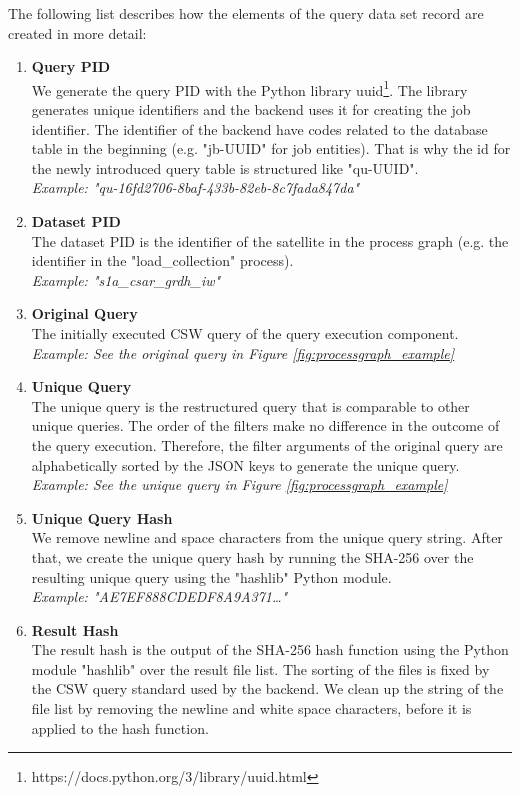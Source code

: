 \documentclass[draft,final]{vutinfth} %
\begin{document}
The following list describes how the elements of the query data set record are created in more detail:
\newpage
\begin{enumerate}
	\item \textbf{Query PID} \\
	We generate the query PID with the Python library uuid\footnote{https://docs.python.org/3/library/uuid.html}. The library generates unique identifiers and the backend uses it for creating the job identifier. The identifier of the backend have codes related to the database table in the beginning (e.g. "jb-UUID" for job entities). That is why the id for the newly introduced query table is structured like "qu-UUID". \\
	\textit{Example: "qu-16fd2706-8baf-433b-82eb-8c7fada847da"}
	\item \textbf{Dataset PID} \\ 
	The dataset PID is the identifier of the satellite in the process graph (e.g. the identifier in the "load\_collection" process). \\
	\textit{Example: "s1a\_csar\_grdh\_iw"}	    	
	\item\textbf{Original Query} \\
	The initially executed CSW query of the query execution component.  \\ 
	\textit{Example: See the original query in Figure \ref{fig:processgraph_example}}	 
	\item \textbf{Unique Query} \\
	The unique query is the restructured query that is comparable to other unique queries. The order of the filters make no difference in the outcome of the query execution. Therefore, the filter arguments of the original query are alphabetically sorted by the JSON keys to generate the unique query. \\
	\textit{Example: See the unique query in Figure \ref{fig:processgraph_example}}	  	 	
	\item \textbf{Unique Query Hash} \\ 
	We remove newline and space characters from the unique query string. After that, we create the unique query hash by running the SHA-256 over the resulting unique query using the "hashlib" Python module.  \\
	\textit{Example: "AE7EF888CDEDF8A9A371\dots"} 
	\newpage
	\item \textbf{Result Hash} \\
	The result hash is the output of the SHA-256 hash function using the Python module "hashlib" over the result file list. {The sorting of the files is fixed by the CSW query standard used by the backend.} We clean up the string of the file list by removing the newline and white space characters, before it is applied to the hash function. \\

\end{enumerate}
\end{document}
